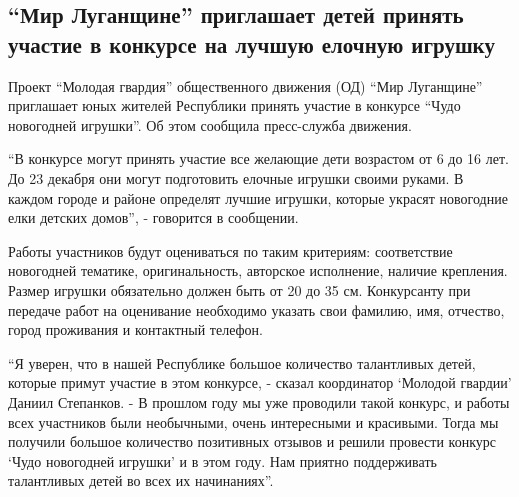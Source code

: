  
 
 
 
 
\subsection{\enquote{Мир Луганщине} приглашает детей принять участие в конкурсе на лучшую елочную игрушку}
\label{sec:14_12_2021.stz.news.lnr.lug_info.1.konkurs_deti_elka_igrushki}


Проект \enquote{Молодая гвардия} общественного движения (ОД) \enquote{Мир Луганщине} приглашает
юных жителей Республики принять участие в конкурсе \enquote{Чудо новогодней игрушки}.
Об этом сообщила пресс-служба движения.


\enquote{В конкурсе могут принять участие все желающие дети возрастом от 6 до 16 лет.
До 23 декабря они могут подготовить елочные игрушки своими руками. В каждом
городе и районе определят лучшие игрушки, которые украсят новогодние елки
детских домов}, - говорится в сообщении.

Работы участников будут оцениваться по таким критериям: соответствие новогодней
тематике, оригинальность, авторское исполнение, наличие крепления. Размер
игрушки обязательно должен быть от 20 до 35 см. Конкурсанту при передаче работ
на оценивание необходимо указать свои фамилию, имя, отчество, город проживания
и контактный телефон.

\enquote{Я уверен, что в нашей Республике большое количество талантливых детей, которые
примут участие в этом конкурсе, - сказал координатор \enquote{Молодой гвардии} Даниил
Степанков. - В прошлом году мы уже проводили такой конкурс, и работы всех
участников были необычными, очень интересными и красивыми. Тогда мы получили
большое количество позитивных отзывов и решили провести конкурс \enquote{Чудо
новогодней игрушки} и в этом году. Нам приятно поддерживать талантливых детей
во всех их начинаниях}.

